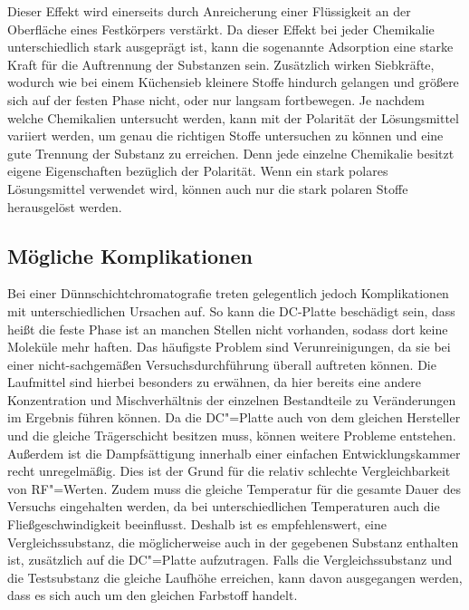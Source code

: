 \documentclass[11pt]{scrreprt}
\begin{document}
Dieser Effekt wird einerseits durch Anreicherung einer Flüssigkeit an der Oberfläche eines Festkörpers verstärkt. Da dieser Effekt bei jeder Chemikalie unterschiedlich stark ausgeprägt ist, kann die sogenannte Adsorption eine starke Kraft für die Auftrennung der Substanzen sein.
 Zusätzlich wirken Siebkräfte, wodurch wie bei einem Küchensieb kleinere Stoffe hindurch gelangen und größere  sich auf der festen Phase nicht, oder nur langsam fortbewegen.
Je nachdem welche Chemikalien untersucht werden, kann  mit der Polarität der Lösungsmittel variiert werden, um genau die richtigen Stoffe untersuchen zu können und eine gute Trennung der Substanz zu erreichen. Denn jede einzelne Chemikalie besitzt eigene Eigenschaften bezüglich der Polarität. Wenn ein stark polares Lösungsmittel verwendet wird, können auch nur die stark polaren Stoffe herausgelöst werden\parencite[S.8-27]{Stahl.1986}.






 

\subsection{Mögliche Komplikationen}
Bei einer Dünnschichtchromatografie treten gelegentlich jedoch Komplikationen mit unterschiedlichen Ursachen auf. So kann die DC-Platte beschädigt sein, dass heißt die feste Phase ist an manchen Stellen nicht vorhanden, sodass dort keine Moleküle mehr haften. Das häufigste Problem sind Verunreinigungen, da sie bei einer nicht-sachgemäßen Versuchsdurchführung überall auftreten können. Die Laufmittel sind hierbei besonders zu erwähnen, da hier bereits eine andere Konzentration und Mischverhältnis der einzelnen Bestandteile zu Veränderungen im Ergebnis führen können. Da die DC"=Platte auch von dem gleichen Hersteller und die gleiche Trägerschicht besitzen muss, können weitere Probleme entstehen. Außerdem ist die Dampfsättigung innerhalb einer einfachen Entwicklungskammer recht unregelmäßig. Dies ist der Grund für die relativ schlechte Vergleichbarkeit von RF"=Werten. Zudem muss die gleiche Temperatur für die gesamte Dauer des Versuchs eingehalten werden, da bei unterschiedlichen Temperaturen auch die Fließgeschwindigkeit beeinflusst. Deshalb ist es empfehlenswert, eine Vergleichssubstanz, die möglicherweise auch in der gegebenen Substanz enthalten ist, zusätzlich auf die DC"=Platte aufzutragen.
Falls die Vergleichssubstanz und die Testsubstanz die gleiche Laufhöhe erreichen, kann davon ausgegangen werden, dass es sich auch um den gleichen Farbstoff handelt\parencite[S.9]{Stahl.1986}.
\end{document}
